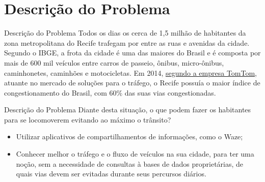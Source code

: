 \section{Descrição do Problema}

\begin{frame}{Descrição do Problema}
	Todos os dias os cerca de 1,5 milhão de habitantes da zona metropolitana do Recife
    trafegam por entre as ruas e avenidas da cidade.
    \vskip 0.25cm
    Segundo o IBGE, a frota da cidade é uma das maiores do Brasil e é composta por mais
    de 600 mil veículos entre carros de passeio, ônibus, micro-ônibus, caminhonetes,
    caminhões e motocicletas.
    \vskip 0.25cm
    Em 2014, \href{http://www.em.com.br/app/noticia/nacional/2014/06/04/interna_nacional,536035/recife-lidera-indice-de-congestionamento-em-pesquisa-da-tomtom.shtml}{segundo a empresa TomTom},
    atuante no mercado de soluções para o tráfego, o Recife possuía o maior índice de 
    congestionamento do Brasil, com $60\%$ das suas vias congestionadas.
\end{frame}


\begin{frame}{Descrição do Problema}
	Diante desta situação, o que podem fazer os habitantes para se locomoverem evitando
    ao máximo o trânsito?
    \vskip 0.5cm
    \begin{itemize}
    \item Utilizar aplicativos de compartilhamentos de informações, como o Waze;
    \item Conhecer melhor o tráfego e o fluxo de veículos na sua cidade, para ter uma
    noção, sem a necessidade de consultas à bases de dados proprietárias, de quais vias
    devem ser evitadas durante seus percursos diários.
    \end{itemize}
\end{frame}
